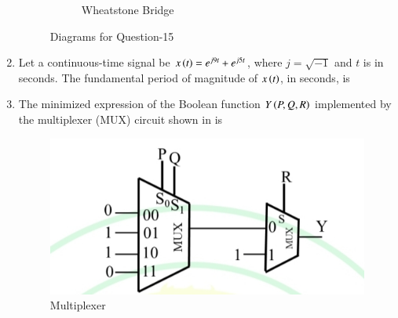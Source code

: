 \documentclass[journal,12pt,onecolumn]{IEEEtran}
\theoremstyle{remark}
\begin{document}
\begin{enumerate}
\begin{figure}[H]
\begin{subfigure}{.5\columnwidth}
  \caption{Wheatstone Bridge}
  \label{15(b)}
\end{subfigure}
\caption{Diagrams for Question-15}
\label{15}
\end{figure}
\begin{enumerate}
\end{enumerate}


\item Let a continuous-time signal be $x\left(t\right) = e^{j9t} + e^{j5t}$, where $j=\sqrt{-1}$ and $t$ is in seconds.  
The fundamental period of magnitude of $x\left(t\right)$, in seconds, is
\par\hfill{}
\begin{enumerate}
\end{enumerate}

\item The minimized expression of the Boolean function $Y\left(P,Q,R\right)$ implemented by the multiplexer (MUX)
circuit shown in  is \par\hfill{}
\begin{figure}[H]
    \centering
    \includegraphics[width=0.5\columnwidth]{Figs/Q-17.jpg}
    \caption{Multiplexer}
    \label{17}
\end{figure}
\begin{enumerate}
\end{enumerate}


\end{enumerate}
\end{document}
